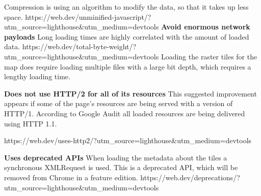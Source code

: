 Compression is using an algorithm to modify the data, so that it takes up less space.
https://web.dev/unminified-javascript/?utm_source=lighthouse&utm_medium=devtools
\textbf{Avoid enormous network payloads}
Long loading times are highly correlated with the amount of loaded data.  
https://web.dev/total-byte-weight/?utm_source=lighthouse&utm_medium=devtools
Loading the raster tiles for the map does require loading multiple files with a large bit depth, which requires a lengthy loading time. 

\textbf{Does not use HTTP/2 for all of its resources}
This suggested improvement appears if some of the page’s resources are being served with a version of HTTP/1. According to Google Audit all loaded resources are being delivered using HTTP 1.1.


https://web.dev/uses-http2/?utm_source=lighthouse&utm_medium=devtools

\textbf{Uses deprecated APIs}
When loading the metadata about the tiles a synchronous XMLRequest is used. This is a deprecated API, which will be removed from Chrome in a feature edition. 
https://web.dev/deprecations/?utm_source=lighthouse&utm_medium=devtools
